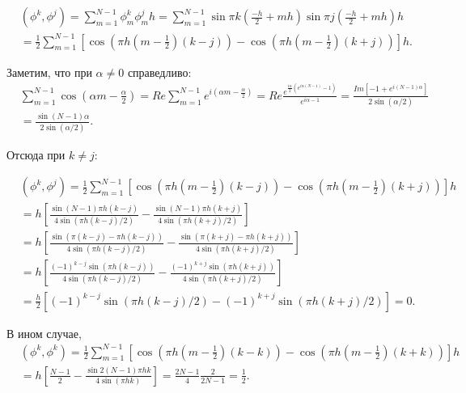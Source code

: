 \documentclass[14pt,a4paper]{extarticle}
\newcommand{\1}{\mathbbm{1}}
\begin{document}
\begin{align*}
     & (\phi^k, \phi^j) = \sum_{m = 1}^{N - 1} \phi_m^k \phi_m^j h
    = \sum_{m = 1}^{N - 1} \sin{\pi k (\frac{-h}{2} + m h)} \sin{\pi j (\frac{-h}{2} + m h)} h                                   \\
     & = \frac{1}{2} \sum_{m = 1}^{N - 1} [ \cos{(\pi h (m - \frac{1}{2})(k - j))} - \cos{(\pi h (m - \frac{1}{2})(k + j))} ] h.
\end{align*}

Заметим, что при $\alpha \neq 0$ справедливо:
\begin{align*}
     & \sum_{m = 1}^{N - 1} \cos(\alpha m - \frac{\alpha}{2}) = Re\sum_{m = 1}^{N - 1} e^{i (\alpha m - \frac{\alpha}{2})}
    = Re \frac{e^{\frac{i \alpha}{2}(e^{i \alpha (N - 1)} - 1)}}{e^{i \alpha - 1}}
    = \frac{Im [-1 + e^{i (N - 1) \alpha}]}{2 \sin(\alpha/2)}                                                              \\
     & = \frac{\sin{(N - 1) \alpha}}{2 \sin(\alpha/2)}.
\end{align*}

Отсюда при $k \neq j$:

\begin{align*}
     & (\phi^k, \phi^j)
    = \frac{1}{2} \sum_{m = 1}^{N - 1} [ \cos{(\pi h (m - \frac{1}{2})(k - j))} - \cos{(\pi h (m - \frac{1}{2})(k + j))} ] h                        \\
     & = h \left[ \frac{\sin{(N - 1) \pi h (k - j)}}{4 \sin(\pi h (k - j)/2)} - \frac{\sin{(N - 1) \pi h (k + j)}}{4 \sin(\pi h (k + j)/2)} \right] \\
     & = h \left[ \frac{\sin(\pi (k - j) - \pi h (k - j))}{4 \sin(\pi h (k - j)/2)}
    - \frac{\sin(\pi (k + j) - \pi h (k + j))}{4 \sin(\pi h (k + j)/2)}\right]                                                                      \\
     & = h \left[ \frac{(-1)^{k-j}\sin(\pi h (k - j))}{4 \sin(\pi h (k - j)/2)}
    - \frac{(-1)^{k+j}\sin(\pi h (k + j))}{4 \sin(\pi h (k + j)/2)}\right]                                                                          \\
     & = \frac{h}{2} [(-1)^{k-j}\sin(\pi h (k - j)/2) - (-1)^{k+j}\sin(\pi h (k + j)/2)] = 0.
\end{align*}

В ином случае,
\begin{align*}
     & (\phi^k, \phi^k)
    = \frac{1}{2} \sum_{m = 1}^{N - 1} [ \cos{(\pi h (m - \frac{1}{2})(k - k))} - \cos{(\pi h (m - \frac{1}{2})(k + k))} ] h \\
     & = h \left[ \frac{N - 1}{2} - \frac{\sin{2 (N - 1) \pi h k}}{4 \sin(\pi h k)} \right]
    = \frac{2 N - 1}{4} \frac{2}{2 N - 1} = \frac{1}{2}.
\end{align*}
\end{document}
